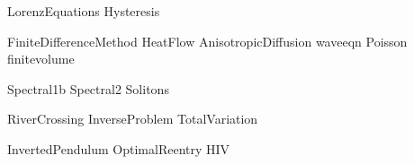 \documentclass[nociteref]{SIAM-GH-book}
\begin{document}
{LorenzEquations}
{Hysteresis}

{FiniteDifferenceMethod}
{HeatFlow}
{AnisotropicDiffusion}
{waveeqn}
{Poisson}
{finitevolume}




{Spectral1b}
{Spectral2}
{Solitons}

{RiverCrossing}
{InverseProblem}
{TotalVariation}

{InvertedPendulum}
{OptimalReentry}
{HIV}
\end{document}
